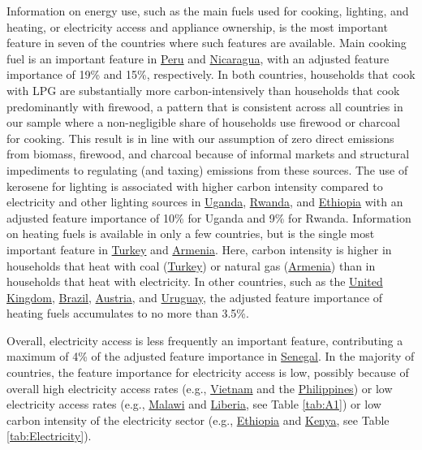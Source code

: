 \documentclass[12pt, a4paper]{article}
\begin{document}
Information on energy use, such as the main fuels used for cooking, lighting, and heating, or electricity access and appliance ownership, is the most important feature in seven of the countries where such features are available. Main cooking fuel is an important feature in \hyperref[fig:5b_PER]{Peru} and \hyperref[fig:5b_NIC]{Nicaragua}, with an adjusted feature importance of 19\% and 15\%, respectively. In both countries, households that cook with LPG are substantially more carbon-intensively than households that cook predominantly with firewood, a pattern that is consistent across all countries in our sample where a non-negligible share of households use firewood or charcoal for cooking. This result is in line with our assumption of zero direct emissions from biomass, firewood, and charcoal because of informal markets and structural impediments to regulating (and taxing) emissions from these sources. The use of kerosene for lighting is associated with higher carbon intensity compared to electricity and other lighting sources in \hyperref[fig:5b_UGA]{Uganda}, \hyperref[fig:5b_RWA]{Rwanda}, and \hyperref[fig:5b_ETH]{Ethiopia} with an adjusted feature importance of 10\% for Uganda and 9\% for Rwanda. Information on heating fuels is available in only a few countries, but is the single most important feature in \hyperref[fig:5b_TUR]{Turkey} and \hyperref[fig:5b_ARM]{Armenia}. Here, carbon intensity is higher in households that heat with coal (\hyperref[fig:5b_TUR]{Turkey}) or natural gas (\hyperref[fig:5b_ARM]{Armenia}) than in households that heat with electricity. In other countries, such as the \hyperref[fig:5b_GBR]{United Kingdom}, \hyperref[fig:5b_BRA]{Brazil}, \hyperref[fig:5b_AUT]{Austria}, and \hyperref[fig:5b_URY]{Uruguay}, the adjusted feature importance of heating fuels accumulates to no more than 3.5\%.

Overall, electricity access is less frequently an important feature, contributing a maximum of 4\% of the adjusted feature importance in \hyperref[fig:5b_SEN]{Senegal}. In the majority of countries, the feature importance for electricity access is low, possibly because of overall high electricity access rates (e.g., \hyperref[fig:5b_VNM]{Vietnam} and the \hyperref[fig:5b_PHL]{Philippines}) or low electricity access rates (e.g., \hyperref[fig:5b_MWI]{Malawi} and \hyperref[fig:5b_LBR]{Liberia}, see Table \ref{tab:A1}) or low carbon intensity of the electricity sector (e.g., \hyperref[fig:5b_ETH]{Ethiopia} and \hyperref[fig:5b_KEN]{Kenya}, see Table \ref{tab:Electricity}).
\end{document}
